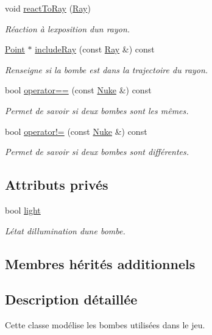 \begin{DoxyCompactItemize}
void \hyperlink{classNuke_a61433c8cba0b6e73c8c490f26bcbbe6b}{react\+To\+Ray} (\hyperlink{classRay}{Ray})
\begin{DoxyCompactList}\small\item\em Réaction à l\textquotesingle{}exposition d\textquotesingle{}un rayon. \end{DoxyCompactList}\item 
\hyperlink{classPoint}{Point} $\ast$ \hyperlink{classNuke_a36dfe7d835bc760a31525898f44ff675}{include\+Ray} (const \hyperlink{classRay}{Ray} \&) const 
\begin{DoxyCompactList}\small\item\em Renseigne si la bombe est dans la trajectoire du rayon. \end{DoxyCompactList}\item 
bool \hyperlink{classNuke_ae47302f18544028d0344da8cd31ccd6e}{operator==} (const \hyperlink{classNuke}{Nuke} \&) const 
\begin{DoxyCompactList}\small\item\em Permet de savoir si deux bombes sont les mêmes. \end{DoxyCompactList}\item 
bool \hyperlink{classNuke_a8970b5250d86dccd68e8d404aa22c53a}{operator!=} (const \hyperlink{classNuke}{Nuke} \&) const 
\begin{DoxyCompactList}\small\item\em Permet de savoir si deux bombes sont différentes. \end{DoxyCompactList}\end{DoxyCompactItemize}
\subsection*{Attributs privés}
\begin{DoxyCompactItemize}
\item 
bool \hyperlink{classNuke_a397479ffd9a1d1786a46c2a284b8234a}{light}
\begin{DoxyCompactList}\small\item\em L\textquotesingle{}état d\textquotesingle{}illumination d\textquotesingle{}une bombe. \end{DoxyCompactList}\end{DoxyCompactItemize}
\subsection*{Membres hérités additionnels}


\subsection{Description détaillée}
Cette classe modélise les bombes utilisées dans le jeu. 

